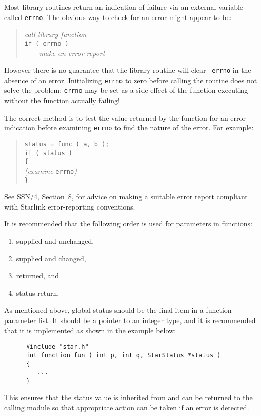 Most library routines return an indication of failure via an external 
variable called {\tt errno}.
The obvious way to check for an error might appear to be:
\begin{quote}
    {\sl call library function}\\
    {\tt if ( errno )}\\
    {\sl  \ \ \ \ make an error report}
\end{quote}
However there is no guarantee that the library routine will clear {\tt 
errno} in the absence of an error. Initializing {\tt errno} to zero
before  calling the routine does not solve the problem;
{\tt errno} may be set as
a side effect of the function executing without the function actually failing!

The correct method is to test the value returned by the function
for an error indication
before examining {\tt errno} to find the nature of the error. For example:
\begin{quote}
      {\tt status = func ( a, b );}\\
      {\tt if ( status )}\\
      {\tt \{}\\
      {\sl (examine} {\tt errno}{\sl )}\\
      {\tt \}}
\end{quote}
See SSN/4, Section~8,  for advice on making a suitable error report
compliant with Starlink error-reporting conventions.


It is recommended that the following order is used for parameters in 
functions:
\begin{enumerate}
\item supplied and unchanged, 
\item supplied and changed, 
\item returned, and 
\item status return.
\end{enumerate}


As mentioned above, global status should be the final item 
in a function parameter list.
It should be a pointer to an integer type, and it is recommended that it is 
implemented as shown in the example below:
\begin{verbatim}
      #include "star.h"
      int function fun ( int p, int q, StarStatus *status )
      {      
         ...
      }
\end{verbatim}
This ensures that the status value is inherited from and can be
returned to the calling module so that appropriate action can be
taken if an error is detected.


